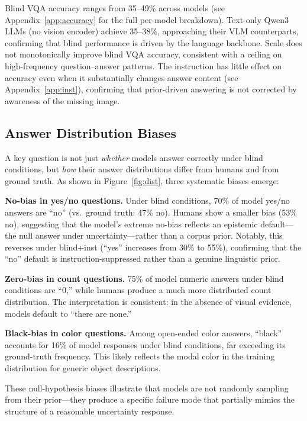 \documentclass[letterpaper]{article}
\begin{document}
Blind VQA accuracy ranges from 35--49\% across models (see Appendix~\ref{app:accuracy}
for the full per-model breakdown). Text-only Qwen3 LLMs (no vision encoder)
achieve 35--38\%, approaching their VLM counterparts, confirming that blind
performance is driven by the language backbone. Scale does not monotonically
improve blind VQA accuracy, consistent with a ceiling on high-frequency
question--answer patterns. The instruction has little effect on accuracy even
when it substantially changes answer content (see Appendix~\ref{app:inst}),
confirming that prior-driven answering is not corrected by awareness of the
missing image.

\subsection{Answer Distribution Biases}

A key question is not just \emph{whether} models answer correctly under blind
conditions, but \emph{how} their answer distributions differ from humans and from
ground truth. As shown in Figure~\ref{fig:dist}, three systematic biases emerge:


\textbf{No-bias in yes/no questions.} Under blind conditions, 70\% of model
yes/no answers are ``no'' (vs.\ ground truth: 47\% no). Humans show a smaller
bias (53\% no), suggesting that the model's extreme no-bias reflects an
epistemic default---the null answer under uncertainty---rather than a corpus
prior. Notably, this reverses under blind+inst (``yes'' increases from 30\% to
55\%), confirming that the ``no'' default is instruction-suppressed rather than
a genuine linguistic prior.

\textbf{Zero-bias in count questions.} 75\% of model numeric answers under
blind conditions are ``0,'' while humans produce a much more distributed
count distribution. The interpretation is consistent: in the absence of
visual evidence, models default to ``there are none.''

\textbf{Black-bias in color questions.} Among open-ended color answers,
``black'' accounts for 16\% of model responses under blind conditions, far
exceeding its ground-truth frequency. This likely reflects the modal color
in the training distribution for generic object descriptions.

These null-hypothesis biases illustrate that models are not randomly sampling
from their prior---they produce a specific failure mode that partially mimics
the structure of a reasonable uncertainty response.
\end{document}
